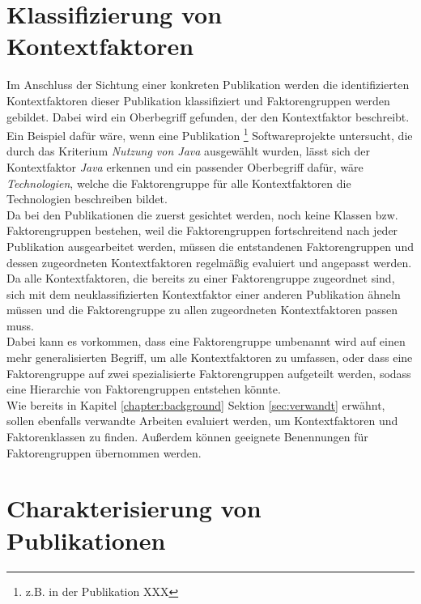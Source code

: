 \section{Klassifizierung von Kontextfaktoren}
\label{sec:class-context}
Im Anschluss der Sichtung einer konkreten Publikation werden die identifizierten Kontextfaktoren dieser Publikation klassifiziert und Faktorengruppen werden gebildet. Dabei wird ein Oberbegriff gefunden, der den Kontextfaktor beschreibt. Ein Beispiel dafür wäre, wenn eine Publikation \footnote{z.B. in der Publikation XXX} Softwareprojekte untersucht, die durch das Kriterium \textit{Nutzung von Java} ausgewählt wurden, lässt sich der Kontextfaktor \textit{Java} erkennen und ein passender Oberbegriff dafür, wäre \textit{Technologien}, welche die Faktorengruppe für alle Kontextfaktoren die Technologien beschreiben bildet. \\

Da bei den Publikationen die zuerst gesichtet werden, noch keine Klassen bzw. Faktorengruppen bestehen, weil die Faktorengruppen fortschreitend nach jeder Publikation ausgearbeitet werden, müssen die entstandenen Faktorengruppen und dessen zugeordneten Kontextfaktoren regelmäßig evaluiert und angepasst werden. Da alle Kontextfaktoren, die bereits zu einer Faktorengruppe zugeordnet sind, sich mit dem neuklassifizierten Kontextfaktor einer anderen Publikation ähneln müssen und die Faktorengruppe zu allen zugeordneten Kontextfaktoren passen muss. \\
Dabei kann es vorkommen, dass eine Faktorengruppe umbenannt wird auf einen mehr generalisierten Begriff, um alle Kontextfaktoren zu umfassen, oder dass eine Faktorengruppe auf zwei spezialisierte Faktorengruppen aufgeteilt werden, sodass eine Hierarchie von Faktorengruppen entstehen könnte. \\


Wie bereits in Kapitel \ref{chapter:background} Sektion \ref{sec:verwandt} erwähnt, sollen ebenfalls verwandte Arbeiten evaluiert werden, um Kontextfaktoren und Faktorenklassen zu finden. Außerdem können geeignete Benennungen für Faktorengruppen  übernommen werden.


\section{Charakterisierung von Publikationen}
\label{sec:character}

